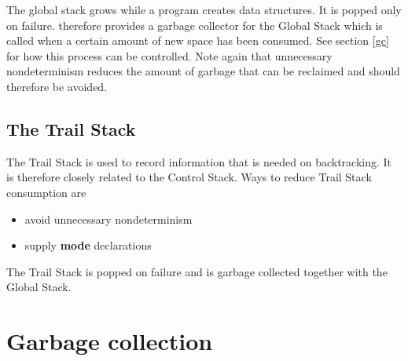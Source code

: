 The global stack grows while a program creates data structures.
It is popped only on failure. {\eclipse} therefore provides a garbage collector
for the Global Stack which is called when a certain amount
of new space has been consumed. See section \ref{gc} for how this process
can be controlled.
Note again that unnecessary nondeterminism reduces the amount of garbage
that can be reclaimed and should therefore be avoided.


\subsection{The Trail Stack}
The Trail Stack is used to record information that is needed on backtracking.
It is therefore closely related to the Control Stack.
Ways to reduce Trail Stack consumption are
\begin{itemize}
\item avoid unnecessary nondeterminism
\item supply {\bf mode} declarations
\end{itemize}
The Trail Stack is popped on failure and
is garbage collected together with the Global Stack.

\section{Garbage collection}
\label{gc}


